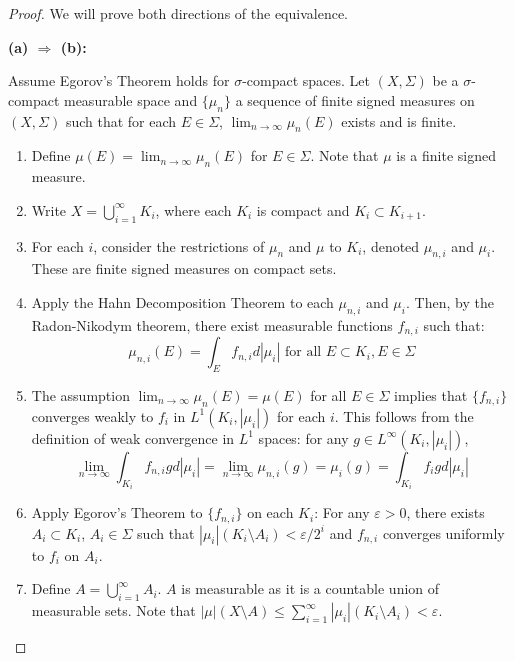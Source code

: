 \documentclass{article}
\begin{document}
\begin{proof}
We will prove both directions of the equivalence.

\noindent\textbf{(a) $\Rightarrow$ (b):}

Assume Egorov's Theorem holds for $\sigma$-compact spaces. Let $(X, \Sigma)$ be a $\sigma$-compact measurable space and $\{\mu_n\}$ a sequence of finite signed measures on $(X, \Sigma)$ such that for each $E \in \Sigma$, $\lim_{n\to\infty} \mu_n(E)$ exists and is finite.

\begin{enumerate}
    \item Define $\mu(E) = \lim_{n\to\infty} \mu_n(E)$ for $E \in \Sigma$. Note that $\mu$ is a finite signed measure.
    
    \item Write $X = \bigcup_{i=1}^{\infty} K_i$, where each $K_i$ is compact and $K_i \subset K_{i+1}$.
    
    \item For each $i$, consider the restrictions of $\mu_n$ and $\mu$ to $K_i$, denoted $\mu_{n,i}$ and $\mu_i$. These are finite signed measures on compact sets.
    
    \item Apply the Hahn Decomposition Theorem to each $\mu_{n,i}$ and $\mu_i$. Then, by the Radon-Nikodym theorem, there exist measurable functions $f_{n,i}$ such that:
    \[\mu_{n,i}(E) = \int_E f_{n,i} d|\mu_i| \text{ for all } E \subset K_i, E \in \Sigma\]
    
    \item The assumption $\lim_{n\to\infty} \mu_n(E) = \mu(E)$ for all $E \in \Sigma$ implies that $\{f_{n,i}\}$ converges weakly to $f_i$ in $L^1(K_i, |\mu_i|)$ for each $i$. This follows from the definition of weak convergence in $L^1$ spaces: for any $g \in L^\infty(K_i, |\mu_i|)$,
    \[\lim_{n\to\infty} \int_{K_i} f_{n,i} g d|\mu_i| = \lim_{n\to\infty} \mu_{n,i}(g) = \mu_i(g) = \int_{K_i} f_i g d|\mu_i|\]
    
    \item Apply Egorov's Theorem to $\{f_{n,i}\}$ on each $K_i$: For any $\varepsilon > 0$, there exists $A_i \subset K_i$, $A_i \in \Sigma$ such that $|\mu_i|(K_i \setminus A_i) < \varepsilon/2^i$ and $f_{n,i}$ converges uniformly to $f_i$ on $A_i$.
    
    \item Define $A = \bigcup_{i=1}^{\infty} A_i$. $A$ is measurable as it is a countable union of measurable sets. Note that $|\mu|(X \setminus A) \leq \sum_{i=1}^{\infty} |\mu_i|(K_i \setminus A_i) < \varepsilon$.
    

\end{enumerate}
\end{proof}
\end{document}
